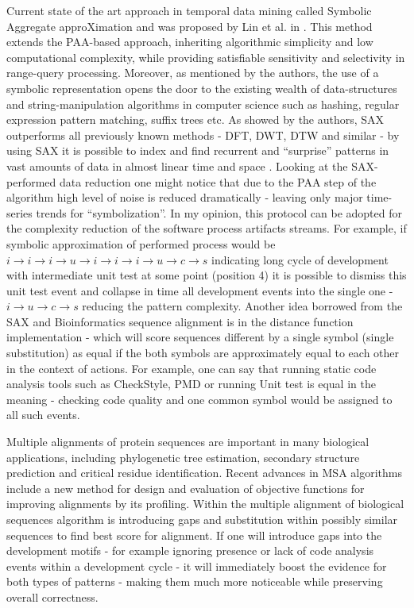 \documentclass{sig-alternate}
\begin{document}
Current state of the art approach in temporal data mining called Symbolic Aggregate approXimation and was proposed by Lin et al. in \cite{citeulike:2821475}. This method extends the PAA-based approach, inheriting algorithmic simplicity and low computational complexity, while providing satisfiable sensitivity and selectivity in range-query processing. Moreover, as mentioned by the authors, the use of a symbolic representation opens the door to the existing wealth of data-structures and string-manipulation algorithms in computer science such as hashing, regular expression pattern matching, suffix trees etc. As showed by the authors, SAX outperforms all previously known methods - DFT, DWT, DTW and similar - by using SAX it is possible to index and find recurrent and ``surprise'' patterns in vast amounts of data in almost linear time and space \cite{citeulike:1630245} \cite{citeulike:3025877} \cite{citeulike:3000416}. Looking at the SAX-performed data reduction one might notice that due to the PAA step of the algorithm high level of noise is reduced dramatically - leaving only major time-series trends for ``symbolization''. In my opinion, this protocol can be adopted for the complexity reduction of the software process artifacts streams. For example, if symbolic approximation of performed process would be $i \rightarrow i \rightarrow i \rightarrow u \rightarrow i \rightarrow i \rightarrow i \rightarrow u \rightarrow c \rightarrow s $ indicating long cycle of development with intermediate unit test at some point (position 4) it is possible to dismiss this unit test event and collapse in time all development events into the single one - $i \rightarrow u \rightarrow c \rightarrow s $ reducing the pattern complexity. Another idea borrowed from the SAX and Bioinformatics sequence alignment is in the distance function implementation - which will score sequences different by a single symbol (single substitution) as equal if the both symbols are approximately equal to each other in the context of actions. For example, one can say that running static code analysis tools such as CheckStyle, PMD or running Unit test is equal in the meaning - checking code quality and one common symbol would be assigned to all such events.

Multiple alignments of protein sequences are important in many biological applications, including phylogenetic tree estimation, secondary structure prediction and critical residue identification. Recent advances in MSA algorithms \cite{citeulike:692} include a new method for design and evaluation of objective functions for improving alignments by its profiling. Within the multiple alignment of biological sequences algorithm is introducing gaps and substitution within possibly similar sequences to find best score for alignment. If one will introduce gaps into the development motifs - for example ignoring presence or lack of code analysis events within a development cycle - it will immediately boost the evidence for both types of patterns - making them much more noticeable while preserving overall correctness.
\end{document}
